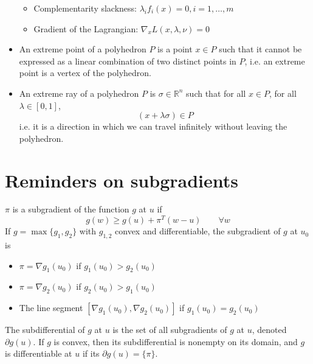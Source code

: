 \documentclass[12pt, openany]{report}
\newcommand{\R}{\mathbb{R}}
\theoremstyle{definition}
\begin{document}
\begin{itemize}
\begin{itemize}
		\item Complementarity slackness: $\lambda_i f_i(x) = 0, i = 1, \dots, m$
		\item Gradient of the Lagrangian: $\nabla_x L(x, \lambda, \nu) = 0$
	\end{itemize}
	\item An extreme point of a polyhedron $P$ is a point $x\in P$ such that it cannot be expressed as a linear combination of two distinct points in $P$, i.e. an extreme point is a vertex of the polyhedron.
	\item An extreme ray of a polyhedron $P$ is $\sigma\in \R^n$ such that for all $x\in P$, for all $\lambda \in [0,1]$, 
	\begin{equation}\label{eq:extreme}
		(x+\lambda \sigma)\in P
	\end{equation}
	i.e. it is a direction in which we can travel infinitely without leaving the polyhedron. 
\end{itemize}
\section{Reminders on subgradients}
$\pi$ is a subgradient of the function $g$ at $u$ if 
\begin{equation}
	g(w)\ge g(u)+ \pi^T(w-u)\qquad \forall w
\end{equation}
If $g=\max \{g_1,g_2\}$ with $g_{1,2}$ convex and differentiable, the subgradient of $g$ at $u_0$ is 
\begin{itemize}
	\item $\pi=\nabla g_1(u_0)$ if $g_1(u_0)>g_2(u_0)$
	\item $\pi=\nabla g_2(u_0)$ if $g_2(u_0)>g_1(u_0)$
	\item The line segment $[\nabla g_1(u_0),\nabla g_2(u_0)]$ if $g_1(u_0)=g_2(u_0)$
\end{itemize}
The subdifferential of $g$ at $u$ is the set of all subgradients of $g$ at $u$, denoted $\partial g(u)$. If $g$ is convex, then its subdifferential is nonempty on its domain, and $g$ is differentiable at $u$ if its $\partial g(u) = \{\pi\}$. 
\end{document}
